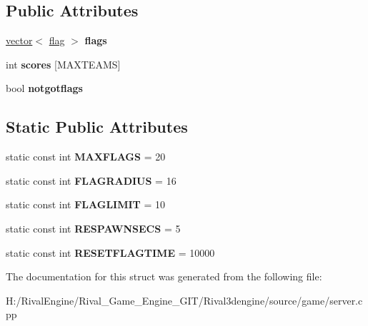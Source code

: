 \subsection*{Public Attributes}
\begin{DoxyCompactItemize}
\item 
\mbox{\label{structserver_1_1ctfservmode_a1271874f869c6d33c6d8186c9e26693b}} 
\hyperlink{structvector}{vector}$<$ \hyperlink{structserver_1_1ctfservmode_1_1flag}{flag} $>$ {\bfseries flags}
\item 
\mbox{\label{structserver_1_1ctfservmode_a99ea10d6fe1fc0f82bb78a546f156ad1}} 
int {\bfseries scores} \mbox{[}M\+A\+X\+T\+E\+A\+MS\mbox{]}
\item 
\mbox{\label{structserver_1_1ctfservmode_a62bab7c9273c7e72ee4de5d17c6aebdc}} 
bool {\bfseries notgotflags}
\end{DoxyCompactItemize}
\subsection*{Static Public Attributes}
\begin{DoxyCompactItemize}
\item 
\mbox{\label{structserver_1_1ctfservmode_a7b9a05fd211dc9631c16aae8c3273a7f}} 
static const int {\bfseries M\+A\+X\+F\+L\+A\+GS} = 20
\item 
\mbox{\label{structserver_1_1ctfservmode_a82d87cfdc4f08784c0fe6efe30ce1a9d}} 
static const int {\bfseries F\+L\+A\+G\+R\+A\+D\+I\+US} = 16
\item 
\mbox{\label{structserver_1_1ctfservmode_ac32e856f76d99823ad5ae2ae58f3ba48}} 
static const int {\bfseries F\+L\+A\+G\+L\+I\+M\+IT} = 10
\item 
\mbox{\label{structserver_1_1ctfservmode_ad8fd3c49f1c8582019b35ca0772f677a}} 
static const int {\bfseries R\+E\+S\+P\+A\+W\+N\+S\+E\+CS} = 5
\item 
\mbox{\label{structserver_1_1ctfservmode_a9e44b6f1f6712720c78d2cc16f120ee4}} 
static const int {\bfseries R\+E\+S\+E\+T\+F\+L\+A\+G\+T\+I\+ME} = 10000
\end{DoxyCompactItemize}


The documentation for this struct was generated from the following file\+:\begin{DoxyCompactItemize}
\item 
H\+:/\+Rival\+Engine/\+Rival\+\_\+\+Game\+\_\+\+Engine\+\_\+\+G\+I\+T/\+Rival3dengine/source/game/server.\+cpp\end{DoxyCompactItemize}
